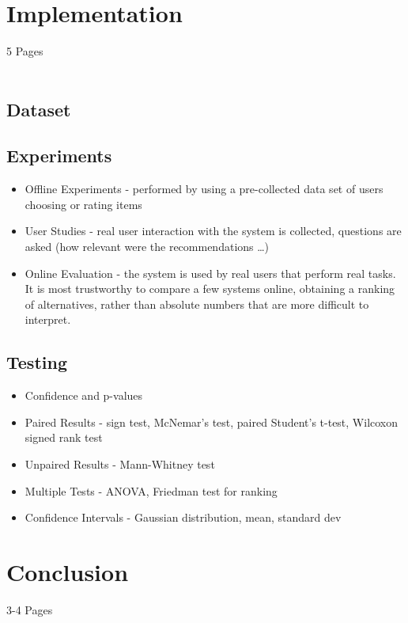 \documentclass[\myFontSize,oneside,english,hidelinks,a4paper]{article}
\begin{document}
\clearpage
\thispagestyle{empty}
\mbox{}




\clearpage{}
\section{Implementation}
5 Pages\\\\

\subsection{Dataset}

\subsection{Experiments}
\cite{Gunawardana2022547}
%
\begin{itemize}
\item Offline Experiments - performed by using a pre-collected data set of users choosing or rating items
\item User Studies - real user interaction with the system is collected, questions are asked (how relevant were the recommendations …)
\item Online Evaluation - the system is used by real users that perform real tasks. It is most trustworthy to compare a few systems online, obtaining a ranking of alternatives, rather than absolute numbers that are more difficult to interpret.
\end{itemize}

\subsection{Testing}
\cite{Gunawardana2022547}
%
\begin{itemize}
\item Confidence and p-values
\item Paired Results - sign test, McNemar's test, paired Student's t-test, Wilcoxon signed rank test
\item Unpaired Results - Mann-Whitney test
\item Multiple Tests - ANOVA, Friedman test for ranking
\item Confidence Intervals - Gaussian distribution, mean, standard dev
\end{itemize}
%


\clearpage{}
\section{Conclusion}
3-4 Pages\\\\



\clearpage
\thispagestyle{empty}
\mbox{}







\clearpage 
\normalsize 
 
 
\nocite{*}
\end{document}

